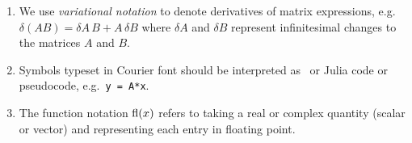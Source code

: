 \begin{enumerate}
\item
  We use {\em variational notation} to denote derivatives of matrix
  expressions, e.g.~$\delta (AB) = \delta A \, B + A \, \delta B$ where
  $\delta A$ and $\delta B$ represent infinitesimal changes to the
  matrices $A$ and $B$.

\item
  Symbols typeset in Courier font should be interpreted as \matlab\ or
  Julia code or pseudocode, e.g.~{\tt y = A*x}.

\item
  The function notation $\operatorname{fl}(x)$ refers to taking a real or complex
  quantity (scalar or vector) and representing each entry in floating
  point.

\end{enumerate}
